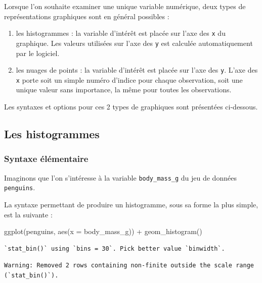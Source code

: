 \documentclass[
  a4paper,
  DIV=11,
  numbers=noendperiod,
  oneside]{scrreprt}
\newenvironment{Shaded}{}{}
\newcommand{\AttributeTok}[1]{\textcolor[rgb]{0.84,0.23,0.29}{#1}}
\newcommand{\FunctionTok}[1]{\textcolor[rgb]{0.44,0.26,0.76}{#1}}
\newcommand{\NormalTok}[1]{\textcolor[rgb]{0.14,0.16,0.18}{#1}}
\newcommand{\SpecialCharTok}[1]{\textcolor[rgb]{0.00,0.36,0.77}{#1}}
\providecommand{\tightlist}{%
  \setlength{\itemsep}{0pt}\setlength{\parskip}{0pt}}\usepackage{longtable,booktabs,array}
\begin{document}
Lorsque l'on souhaite examiner une unique variable numérique, deux types
de représentations graphiques sont en général possibles :

\begin{enumerate}
\def\labelenumi{\arabic{enumi}.}
\tightlist
\item
  les histogrammes : la variable d'intérêt est placée sur l'axe des
  \texttt{x} du graphique. Les valeurs utilisées sur l'axe des
  \texttt{y} est calculée automatiquement par le logiciel.
\item
  les nuages de points : la variable d'intérêt est placée sur l'axe des
  \texttt{y}. L'axe des \texttt{x} porte soit un simple numéro d'indice
  pour chaque observation, soit une unique valeur sans importance, la
  même pour toutes les observations.
\end{enumerate}

Les syntaxes et options pour ces 2 types de graphiques sont présentées
ci-dessous.

\subsection{Les histogrammes}\label{les-histogrammes}

\subsubsection{Syntaxe élémentaire}\label{syntaxe-uxe9luxe9mentaire}

Imaginons que l'on s'intéresse à la variable \texttt{body\_mass\_g} du
jeu de données \texttt{penguins}.

La syntaxe permettant de produire un histogramme, sous sa forme la plus
simple, est la suivante :

\begin{Shaded}
\begin{Highlighting}[]
\FunctionTok{ggplot}\NormalTok{(penguins, }\FunctionTok{aes}\NormalTok{(}\AttributeTok{x =}\NormalTok{ body\_mass\_g)) }\SpecialCharTok{+}
  \FunctionTok{geom\_histogram}\NormalTok{()}
\end{Highlighting}
\end{Shaded}

\begin{verbatim}
`stat_bin()` using `bins = 30`. Pick better value `binwidth`.
\end{verbatim}

\begin{verbatim}
Warning: Removed 2 rows containing non-finite outside the scale range
(`stat_bin()`).
\end{verbatim}
\end{document}
